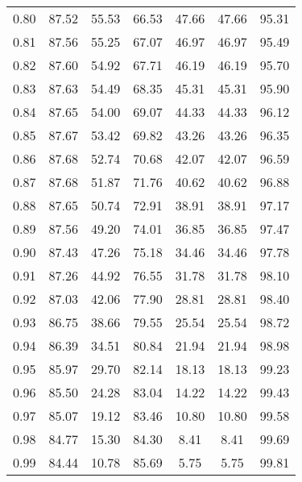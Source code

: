 \begin{tabular}{|c|c|c|c|c|c|c|}
      0.80 &     87.52 &     55.53 &      66.53 &   47.66 &      47.66 &         95.31 \\
      0.81 &     87.56 &     55.25 &      67.07 &   46.97 &      46.97 &         95.49 \\
      0.82 &     87.60 &     54.92 &      67.71 &   46.19 &      46.19 &         95.70 \\
      0.83 &     87.63 &     54.49 &      68.35 &   45.31 &      45.31 &         95.90 \\
      0.84 &     87.65 &     54.00 &      69.07 &   44.33 &      44.33 &         96.12 \\
      0.85 &     87.67 &     53.42 &      69.82 &   43.26 &      43.26 &         96.35 \\
      0.86 &     87.68 &     52.74 &      70.68 &   42.07 &      42.07 &         96.59 \\
      0.87 &     87.68 &     51.87 &      71.76 &   40.62 &      40.62 &         96.88 \\
      0.88 &     87.65 &     50.74 &      72.91 &   38.91 &      38.91 &         97.17 \\
      0.89 &     87.56 &     49.20 &      74.01 &   36.85 &      36.85 &         97.47 \\
      0.90 &     87.43 &     47.26 &      75.18 &   34.46 &      34.46 &         97.78 \\
      0.91 &     87.26 &     44.92 &      76.55 &   31.78 &      31.78 &         98.10 \\
      0.92 &     87.03 &     42.06 &      77.90 &   28.81 &      28.81 &         98.40 \\
      0.93 &     86.75 &     38.66 &      79.55 &   25.54 &      25.54 &         98.72 \\
      0.94 &     86.39 &     34.51 &      80.84 &   21.94 &      21.94 &         98.98 \\
      0.95 &     85.97 &     29.70 &      82.14 &   18.13 &      18.13 &         99.23 \\
      0.96 &     85.50 &     24.28 &      83.04 &   14.22 &      14.22 &         99.43 \\
      0.97 &     85.07 &     19.12 &      83.46 &   10.80 &      10.80 &         99.58 \\
      0.98 &     84.77 &     15.30 &      84.30 &    8.41 &       8.41 &         99.69 \\
      0.99 &     84.44 &     10.78 &      85.69 &    5.75 &       5.75 &         99.81 \\
\bottomrule
\end{tabular}
